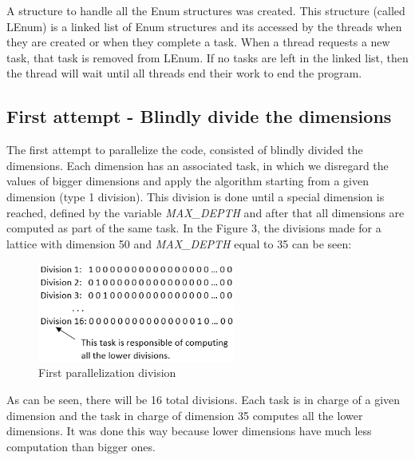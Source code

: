 \documentclass[conference]{IEEEtran}
\begin{document}
A structure to handle all the Enum structures was created. This structure (called LEnum) is a linked list of Enum structures and its accessed by the threads when they are created or when they complete a task. When a thread requests a new task, that task is removed from LEnum. If no tasks are left in the linked list, then the thread will wait until all threads end their work to end the program.


\subsection{First attempt - Blindly divide the dimensions}
The first attempt to parallelize the code, consisted of blindly divided the dimensions. Each dimension has an associated task, in which we disregard the values of bigger dimensions and apply the algorithm starting from a given dimension (type 1 division). This division is done until a special dimension is reached, defined by the variable \emph{MAX\_DEPTH} and after that all dimensions are computed as part of the same task. 
In the Figure 3, the divisions made for a lattice with dimension 50 and \emph{MAX\_DEPTH} equal to 35 can be seen:

\begin{figure}[ht!]
\centering
\includegraphics[width=65mm]{imgParallel/PrimeiraParalelizacao}
\caption{First parallelization division}
\end{figure}

As can be seen, there will be 16 total divisions. Each task is in charge of a given dimension and the task in charge of dimension 35 computes all the lower dimensions. It was done this way because lower dimensions have much less computation than bigger ones. 
\end{document}
